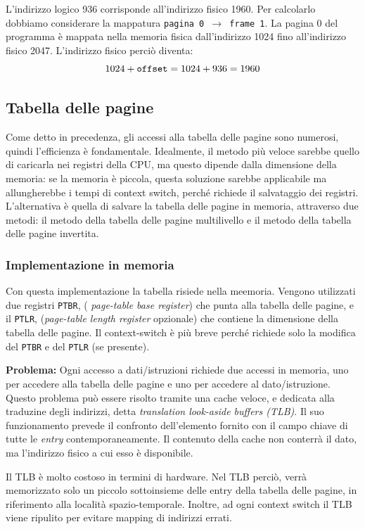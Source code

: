 \documentclass[a4paper,12pt, twoside]{report}
\begin{document}
L'indirizzo logico 936 corrisponde all'indirizzo fisico 1960. Per calcolarlo dobbiamo considerare la mappatura 
\texttt{pagina 0 $\to$ frame 1}. La pagina 0 del programma \`e mappata nella memoria fisica dall'indirizzo 1024 fino 
all'indirizzo fisico 2047. L'indirizzo fisico perci\`o diventa: \[1024 + \text{\texttt{offset}} = 1024 + 936 = 1960\]

\subsection{Tabella delle pagine}
Come detto in precedenza, gli accessi alla tabella delle pagine sono numerosi, quindi l'efficienza \`e fondamentale.
Idealmente, il metodo pi\`u veloce sarebbe quello di caricarla nei registri della CPU, ma questo dipende dalla 
dimensione della memoria: se la memoria \`e piccola, questa soluzione sarebbe applicabile ma allungherebbe i tempi
di context switch, perch\'e richiede il salvataggio dei registri. L'alternativa \`e quella di salvare la tabella delle pagine in
memoria, attraverso due metodi: il metodo della tabella delle pagine multilivello e il metodo della tabella delle pagine
invertita.

\subsubsection{Implementazione in memoria}

Con questa implementazione la tabella risiede nella meemoria. Vengono utilizzati due registri \texttt{PTBR}, (\emph{ page-table base register}) che punta alla tabella delle pagine, e il \texttt{PTLR}, (\emph{page-table length register}  opzionale) che contiene la dimensione della tabella delle pagine.
Il context-switch \`e pi\`u breve perch\'e richiede solo la modifica del \texttt{PTBR} e del \texttt{PTLR} (se presente).

\textbf{Problema:} Ogni accesso a dati/istruzioni richiede due accessi in memoria, uno per accedere alla tabella delle pagine e uno per accedere al dato/istruzione.
Questo problema pu\`o essere risolto tramite una cache veloce, e dedicata alla traduzine degli indirizzi, detta \emph{translation look-aside buffers (TLB)}. Il suo funzionamento prevede il confronto dell'elemento fornito con il campo chiave di tutte le \emph{entry} contemporaneamente. Il contenuto della cache non conterr\`a il dato, ma l'indirizzo fisico a cui esso \`e disponibile. 

Il TLB \`e molto costoso in termini di hardware. Nel TLB perci\`o, verr\`a memorizzato solo un piccolo sottoinsieme 
delle entry della tabella delle pagine, in riferimento alla localit\`a spazio-temporale. Inoltre, ad ogni context switch
il TLB viene ripulito per evitare mapping di indirizzi errati. 
\end{document}
